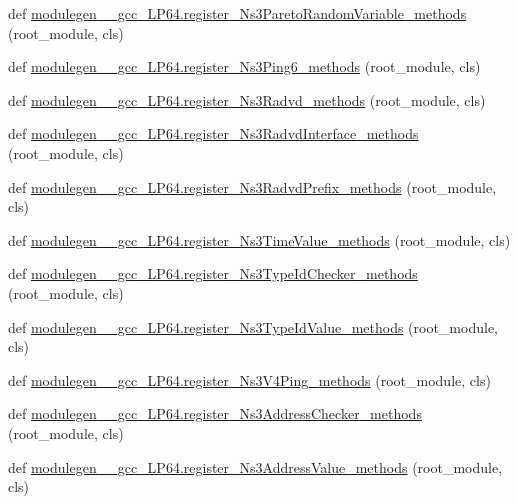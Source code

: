 \begin{DoxyCompactItemize}
\item 
def \hyperlink{namespacemodulegen____gcc__LP64_aa21dc78e803a5556dfdef52ccbbd7b3c}{modulegen\+\_\+\+\_\+gcc\+\_\+\+L\+P64.\+register\+\_\+\+Ns3\+Pareto\+Random\+Variable\+\_\+methods} (root\+\_\+module, cls)
\item 
def \hyperlink{namespacemodulegen____gcc__LP64_abb809d47158f22aea430aa9e2449f6af}{modulegen\+\_\+\+\_\+gcc\+\_\+\+L\+P64.\+register\+\_\+\+Ns3\+Ping6\+\_\+methods} (root\+\_\+module, cls)
\item 
def \hyperlink{namespacemodulegen____gcc__LP64_a238e1a64b3b5731d925ef86b39d1fb48}{modulegen\+\_\+\+\_\+gcc\+\_\+\+L\+P64.\+register\+\_\+\+Ns3\+Radvd\+\_\+methods} (root\+\_\+module, cls)
\item 
def \hyperlink{namespacemodulegen____gcc__LP64_ad86da8e4e4261c01a5f12581b551a173}{modulegen\+\_\+\+\_\+gcc\+\_\+\+L\+P64.\+register\+\_\+\+Ns3\+Radvd\+Interface\+\_\+methods} (root\+\_\+module, cls)
\item 
def \hyperlink{namespacemodulegen____gcc__LP64_abe81c5bfbfaebfa4e447c873ed6701b1}{modulegen\+\_\+\+\_\+gcc\+\_\+\+L\+P64.\+register\+\_\+\+Ns3\+Radvd\+Prefix\+\_\+methods} (root\+\_\+module, cls)
\item 
def \hyperlink{namespacemodulegen____gcc__LP64_a074f52c8db74b3898d974bf33a0240f8}{modulegen\+\_\+\+\_\+gcc\+\_\+\+L\+P64.\+register\+\_\+\+Ns3\+Time\+Value\+\_\+methods} (root\+\_\+module, cls)
\item 
def \hyperlink{namespacemodulegen____gcc__LP64_aaf5d00575008532556e0df2d3b8d5bef}{modulegen\+\_\+\+\_\+gcc\+\_\+\+L\+P64.\+register\+\_\+\+Ns3\+Type\+Id\+Checker\+\_\+methods} (root\+\_\+module, cls)
\item 
def \hyperlink{namespacemodulegen____gcc__LP64_ab25f30f66f8ae8da64444bac683dac7c}{modulegen\+\_\+\+\_\+gcc\+\_\+\+L\+P64.\+register\+\_\+\+Ns3\+Type\+Id\+Value\+\_\+methods} (root\+\_\+module, cls)
\item 
def \hyperlink{namespacemodulegen____gcc__LP64_ae9531951f7105d8e8adb4f0e5e136c70}{modulegen\+\_\+\+\_\+gcc\+\_\+\+L\+P64.\+register\+\_\+\+Ns3\+V4\+Ping\+\_\+methods} (root\+\_\+module, cls)
\item 
def \hyperlink{namespacemodulegen____gcc__LP64_a89e9f561a2c1e1e454b475d69805122f}{modulegen\+\_\+\+\_\+gcc\+\_\+\+L\+P64.\+register\+\_\+\+Ns3\+Address\+Checker\+\_\+methods} (root\+\_\+module, cls)
\item 
def \hyperlink{namespacemodulegen____gcc__LP64_afbde1a3f3b1b9e58c7c95df3cbbef1ae}{modulegen\+\_\+\+\_\+gcc\+\_\+\+L\+P64.\+register\+\_\+\+Ns3\+Address\+Value\+\_\+methods} (root\+\_\+module, cls)

\end{DoxyCompactItemize}
